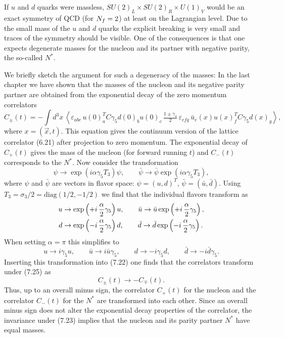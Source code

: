 If $u$ and $d$ quarks were massless, $SU(2)_L \times SU(2)_R \times U(1)_V$
would be an exact symmetry of QCD (for $N_f = 2$) at least on the Lagrangian
level. Due to the small mass of the $u$ and $d$ quarks the explicit breaking
is very small and traces of the symmetry should be visible. One of the
consequences is that one expects degenerate masses for the nucleon and its
partner with negative parity, the so-called $N^*$.

We briefly sketch the argument for such a degeneracy of the masses: In the
last chapter we have shown that the masses of the nucleon and its negative
parity partner are obtained from the exponential decay of the zero momentum
correlators
\begin{equation}
  C_\pm(t) = -\int d^3x\,
  \left\langle
    \varepsilon_{abc}\,u(0)^T_a C\gamma_5 d(0)_b u(0)_c\,
    \tfrac{1\pm\gamma_4}{2}\,
    \varepsilon_{efg}\,\bar{u}_e(x) u(x)^T_f C\gamma_5 d(x)_g
  \right\rangle,
\end{equation}
where $x = (\vec{x}, t)$. This equation gives the continuum version of the
lattice correlator (6.21) after projection to zero momentum. The exponential
decay of $C_+(t)$ gives the mass of the nucleon (for forward running $t$) and
$C_-(t)$ corresponds to the $N^*$. Now consider the transformation
\begin{equation}
  \psi \to \exp\left(i\alpha\gamma_5 T_3\right)\psi,
  \qquad
  \bar\psi \to \bar\psi\exp\left(i\alpha\gamma_5 T_3\right),
\end{equation}
where $\psi$ and $\bar\psi$ are vectors in flavor space:
$\psi = (u, d)^T$, $\bar\psi = (\bar{u}, \bar{d})$. Using
$T_3 = \sigma_3/2 = \mathrm{diag}(1/2, -1/2)$ we find that the individual
flavors transform as
\begin{align}
  u &\to \exp\left(+i\,\frac{\alpha}{2}\gamma_5\right)u, \qquad
  \bar{u} \to \bar{u}\exp\left(+i\,\frac{\alpha}{2}\gamma_5\right), \notag\\
  d &\to \exp\left(-i\,\frac{\alpha}{2}\gamma_5\right)d, \qquad
  \bar{d} \to \bar{d}\exp\left(-i\,\frac{\alpha}{2}\gamma_5\right).
\end{align}
When setting $\alpha = \pi$ this simplifies to
\begin{equation}
  u \to i\gamma_5 u, \qquad
  \bar{u} \to i\bar{u}\gamma_5, \qquad
  d \to -i\gamma_5 d, \qquad
  \bar{d} \to -i\bar{d}\gamma_5 .
\end{equation}
Inserting this transformation into (7.22) one finds that the correlators
transform under (7.25) as
\begin{equation}
  C_\pm(t) \to -C_\mp(t) .
\end{equation}
Thus, up to an overall minus sign, the correlator $C_+(t)$ for the nucleon and
the correlator $C_-(t)$ for the $N^*$ are transformed into each other. Since
an overall minus sign does not alter the exponential decay properties of the
correlator, the invariance under (7.23) implies that the nucleon and its
parity partner $N^*$ have equal masses.


